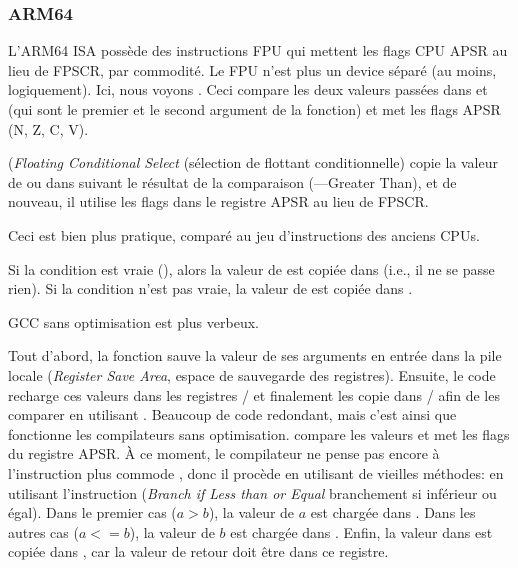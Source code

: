 \subsubsection{ARM64}




L'ARM64 \ac{ISA} possède des instructions FPU qui mettent les flags CPU \ac{APSR}
au lieu de \ac{FPSCR}, par commodité.
Le \ac{FPU} n'est plus un device séparé (au moins, logiquement).
Ici, nous voyons . Ceci compare les deux valeurs passées dans 
et  (qui sont le premier et le second argument de la fonction) et met les
flags \ac{APSR} (N, Z, C, V).

 (\emph{Floating Conditional Select} (sélection de flottant conditionnelle)
copie la valeur de  ou  dans  suivant le résultat de la comparaison
(---Greater Than), et de nouveau, il utilise les flags dans le registre \ac{APSR}
au lieu de \ac{FPSCR}.

Ceci est bien plus pratique, comparé au jeu d'instructions des anciens CPUs.

Si la condition est vraie (), alors la valeur de  est copiée dans
 (i.e., il ne se passe rien).
Si la condition n'est pas vraie, la valeur de  est copiée dans .




GCC sans optimisation est plus verbeux.

Tout d'abord, la fonction sauve la valeur de ses arguments en entrée dans la pile
locale (\emph{Register Save Area}, espace de sauvegarde des registres).
Ensuite, le code recharge ces valeurs dans les registres / et finalement
les copie dans / afin de les comparer en utilisant .
Beaucoup de code redondant, mais c'est ainsi que fonctionne les compilateurs sans
optimisation.
 compare les valeurs et met les flags du registre \ac{APSR}.
À ce moment, le compilateur ne pense pas encore à l'instruction plus commode ,
donc il procède en utilisant de vieilles méthodes:
en utilisant l'instruction  (\emph{Branch if Less than or Equal} branchement si
inférieur ou égal).
Dans le premier cas ($a>b$), la valeur de $a$ est chargée dans .
Dans les autres cas ($a<=b$), la valeur de $b$ est chargée dans .
Enfin, la valeur dans  est copiée dans , car la valeur de retour
doit être dans ce registre.

